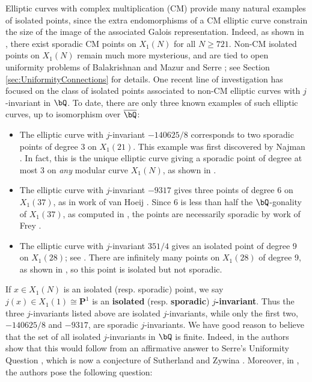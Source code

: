 \documentclass[11pt,reqno]{amsart}
\theoremstyle{plain}
\theoremstyle{definition}
\newcommand{\Q}{\bQ}
\begin{document}
Elliptic curves with complex multiplication (CM) provide many natural examples
of isolated points, since the extra endomorphisms of a CM elliptic curve
constrain the size of the image of the associated Galois representation.
Indeed, as shown in \cite[Theorem~8.2]{CGPS2022}, there exist sporadic CM
points on $X_1(N)$ for all $N\geq 721$. Non-CM isolated points on $X_1(N)$ remain much more mysterious, and are tied to open uniformity problems of Balakrishnan and Mazur \cite[Conjecture 17]{BalakrishnanMazur23} and Serre \cite[$\S4.3$]{serre72}; see Section \ref{sec:UniformityConnections} for details. One recent line of investigation has focused on the class of isolated points associated to non-CM elliptic curves with $j$-invariant in $\Q$. To date, there are only three known examples of such elliptic curves, up to isomorphism over $\overline{\Q}$:
\begin{itemize}
    \item The elliptic curve with $j$-invariant $-140625/8$ corresponds to two sporadic points of degree 3 on $X_1(21)$. This example was first discovered by Najman \cite{najman16}. In fact, this is the unique elliptic curve giving a sporadic point of degree at most 3 on \emph{any} modular curve $X_1(N)$, as shown in \cite{DEvHMZB2021}.

    \item The elliptic curve with $j$-invariant $-9317$ gives three points of degree 6 on $X_1(37)$, as in work of van Hoeij \cite{vanHoeij}. Since 6 is less than half the $\Q$-gonality of $X_1(37)$, as computed in \cite{DerickxVanHoeij2014}, the points are necessarily sporadic by work of Frey \cite{frey}.

    \item The elliptic curve with $j$-invariant $351/4$ gives an isolated point of degree 9 on $X_1(28)$; see \cite[Theorem 2]{OddDeg}. There are infinitely many points on $X_1(28)$ of degree 9, as shown in \cite{DerickxVanHoeij2014}, so this point is isolated but not sporadic.
\end{itemize}

If $x \in X_1(N)$ is an isolated (resp. sporadic) point, we say $j(x) \in X_1(1) \cong \mathbf{P}^1$ is an \textbf{isolated} (resp. \textbf{sporadic}) \textbf{$j$-invariant}. Thus the three $j$-invariants listed above are isolated $j$-invariants, while only the first two, $-140625/8$ and $-9317$, are sporadic $j$-invariants. We have good reason to believe that the set of all isolated $j$-invariants in $\Q$ is finite. Indeed, in \cite[Corollary 1.7]{BELOV} the authors show that this would follow from an affirmative answer to Serre’s Uniformity Question \cite{serre72}, which is now a conjecture of Sutherland \cite{sutherland} and Zywina \cite{ZywinaImages}. Moreover, in \cite[$\S1.2$]{BELOV}, the authors pose the following question:
\end{document}
